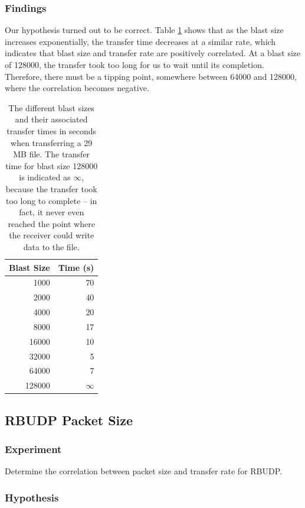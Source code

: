 \documentclass[10pt, a4paper]{article}
\begin{document}
\subsubsection{Findings}
\label{subsubsec:findings-2}

Our hypothesis turned out to be correct. Table \ref{tab:blast-time} shows that
as the blast size increases exponentially, the transfer time decreases at a
similar rate, which indicates that blast size and transfer rate are positively
correlated. At a blast size of 128000, the transfer took too long for us to wait
until its completion. Therefore, there must be a tipping point, somewhere between
64000 and 128000, where the correlation becomes negative.

\begin{table}
  \centering
  \begin{tabular}{@{}rr@{}}
    \toprule
    Blast Size & Time (s) \\
    \midrule
    1000 & 70 \\
    2000 & 40 \\
    4000 & 20 \\
    8000 & 17 \\
    16000 & 10 \\
    32000 & 5 \\
    64000 & 7 \\
    128000 & $\infty$ \\
    \bottomrule
  \end{tabular}
  \caption{The different blast sizes and their associated transfer times in
  seconds when transferring a 29 MB file. The transfer time for blast size
  128000 is indicated as $\infty$, because the transfer took too long to
  complete -- in fact, it never even reached the point where the receiver could
  write data to the file.}
  \label{tab:blast-time}
\end{table}

\subsection{RBUDP Packet Size}
\label{subsec:rbudp-pkt-sz}

\subsubsection{Experiment}
\label{subsubsec:exp-3}

Determine the correlation between packet size and transfer rate for RBUDP.

\subsubsection{Hypothesis}
\label{subsubsec:exp-3}
\end{document}
